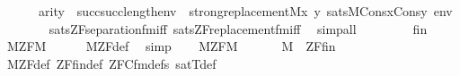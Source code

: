 \begin{isabellebody}
\ \ \ \ \ \ {\isachardoublequoteopen}arity{\isacharparenleft}{\kern0pt}{\isasymphi}{\isacharparenright}{\kern0pt}\ {\isasymle}\ succ{\isacharparenleft}{\kern0pt}succ{\isacharparenleft}{\kern0pt}length{\isacharparenleft}{\kern0pt}env{\isacharparenright}{\kern0pt}{\isacharparenright}{\kern0pt}{\isacharparenright}{\kern0pt}\ {\isasymLongrightarrow}\ strong{\isacharunderscore}{\kern0pt}replacement{\isacharparenleft}{\kern0pt}{\isacharhash}{\kern0pt}{\isacharhash}{\kern0pt}M{\isacharcomma}{\kern0pt}{\isasymlambda}x\ y{\isachardot}{\kern0pt}\ sats{\isacharparenleft}{\kern0pt}M{\isacharcomma}{\kern0pt}{\isasymphi}{\isacharcomma}{\kern0pt}Cons{\isacharparenleft}{\kern0pt}x{\isacharcomma}{\kern0pt}Cons{\isacharparenleft}{\kern0pt}y{\isacharcomma}{\kern0pt}\ env{\isacharparenright}{\kern0pt}{\isacharparenright}{\kern0pt}{\isacharparenright}{\kern0pt}{\isacharparenright}{\kern0pt}{\isachardoublequoteclose}\isanewline
\ \ \ \ \ \ \isamarkupfalse%
\ sats{\isacharunderscore}{\kern0pt}ZF{\isacharunderscore}{\kern0pt}separation{\isacharunderscore}{\kern0pt}fm{\isacharunderscore}{\kern0pt}iff\ sats{\isacharunderscore}{\kern0pt}ZF{\isacharunderscore}{\kern0pt}replacement{\isacharunderscore}{\kern0pt}fm{\isacharunderscore}{\kern0pt}iff\ \isamarkupfalse%
\ simp{\isacharunderscore}{\kern0pt}all\ \ \isanewline
\ \ \isacommand{{\isacharbraceright}{\kern0pt}}\isamarkupfalse%
\isanewline
\ \ \isamarkupfalse%
\ fin\isanewline
\ \ \isamarkupfalse%
\ {\isachardoublequoteopen}M{\isacharunderscore}{\kern0pt}ZF{\isacharparenleft}{\kern0pt}M{\isacharparenright}{\kern0pt}{\isachardoublequoteclose}\isanewline
\ \ \ \ \isamarkupfalse%
\ M{\isacharunderscore}{\kern0pt}ZF{\isacharunderscore}{\kern0pt}def\ \isamarkupfalse%
\ simp\isanewline
{}\isamarkupfalse%
\isanewline
\ \ \isamarkupfalse%
\ {\isacartoucheopen}M{\isacharunderscore}{\kern0pt}ZF{\isacharparenleft}{\kern0pt}M{\isacharparenright}{\kern0pt}{\isacartoucheclose}\isanewline
\ \ \isamarkupfalse%
\isanewline
\ \ \isamarkupfalse%
\ {\isachardoublequoteopen}M\ {\isasymTurnstile}\ ZF{\isacharunderscore}{\kern0pt}fin{\isachardoublequoteclose}\ \isanewline
\ \ \ \ \isamarkupfalse%
\ M{\isacharunderscore}{\kern0pt}ZF{\isacharunderscore}{\kern0pt}def\ ZF{\isacharunderscore}{\kern0pt}fin{\isacharunderscore}{\kern0pt}def\ ZFC{\isacharunderscore}{\kern0pt}fm{\isacharunderscore}{\kern0pt}defs\ satT{\isacharunderscore}{\kern0pt}def\isanewline
\ \ \ \ \isamarkupfalse%

\end{isabellebody}
